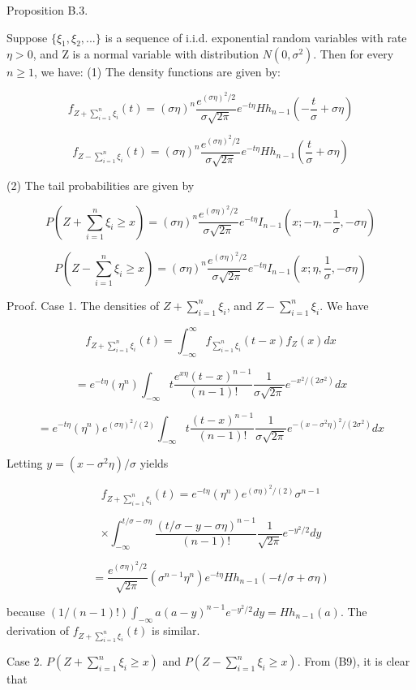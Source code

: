 Proposition B.3.

Suppose $\{\xi_{1},\xi_{2},...\}$ is a sequence of i.i.d. exponential random variables with rate $\eta>0$, and Z is a normal variable with distribution $N(0,\sigma^{2})$. Then for every $ n \geq 1$, we have: (1) The density functions are given by:

$$f_{Z+\sum_{i=1}^{n}\xi_{i}}(t)=(\sigma\eta)^{n}\frac{e^{(\sigma\eta)^{2}/2}}{\sigma\sqrt{2\pi}}e^{-t\eta}Hh_{n-1}(-\frac{t}{\sigma}+\sigma\eta)$$

$$f_{Z-\sum_{i=1}^{n}\xi_{i}}(t)=(\sigma\eta)^{n}\frac{e^{(\sigma\eta)^{2}/2}}{\sigma\sqrt{2\pi}}e^{-t\eta}Hh_{n-1}(\frac{t}{\sigma}+\sigma\eta)$$

(2) The tail probabilities are given by

$$P(Z+\sum_{i=1}^{n}\xi_{i}\geq x) = (\sigma\eta)^{n}\frac{e^{(\sigma\eta)^{2}/2}}{\sigma\sqrt{2\pi}}e^{-t\eta}I_{n-1}(x;-\eta,-\frac{1}{\sigma},-\sigma\eta)$$

$$P(Z-\sum_{i=1}^{n}\xi_{i}\geq x) = (\sigma\eta)^{n}\frac{e^{(\sigma\eta)^{2}/2}}{\sigma\sqrt{2\pi}}e^{-t\eta}I_{n-1}(x;\eta,\frac{1}{\sigma},-\sigma\eta)$$

Proof. Case 1. The densities of $Z+\sum_{i=1}^{n}\xi_{i}$, and $Z-\sum_{i=1}^{n}\xi_{i}$. We have

$$f_{Z+\sum_{i=1}^{n}\xi_{i}}(t)=\int_{-\infty}^{\infty}f_{\sum_{i=1}^{n}\xi_{i}}(t-x)f_{Z}(x)dx$$

$$=e^{-t\eta}(\eta^{n})\int_{-\infty}{t}\frac{e^{x\eta}(t-x)^{n-1}}{(n-1)!}\frac{1}{\sigma\sqrt{2\pi}}e^{-x^{2}/(2\sigma^{2})}dx$$

$$=e^{-t\eta}(\eta^{n})e^{(\sigma\eta)^{2}/(2)}\int_{-\infty}{t}\frac{(t-x)^{n-1}}{(n-1)!}\frac{1}{\sigma\sqrt{2\pi}}e^{-(x-\sigma^{2}\eta)^{2}/(2\sigma^{2})}dx$$

Letting $y=(x-\sigma^{2}\eta)/\sigma$ yields

$$f_{Z+\sum_{i=1}^{n}\xi_{i}}(t)=e^{-t\eta}(\eta^{n})e^{(\sigma\eta)^{2}/(2)}\sigma^{n-1}$$

$$\times\int_{-\infty}^{t/\sigma-\sigma\eta}\frac{(t/\sigma - y -\sigma\eta)^{n-1}}{(n-1)!}\frac{1}{\sqrt{2\pi}}e^{-y^{2}/2}dy$$

$$=\frac{e^{(\sigma\eta)^{2}/2}}{\sqrt{2\pi}}(\sigma^{n-1}\eta^{n})e^{-t\eta}Hh_{n-1}(-t/\sigma + \sigma\eta)$$

because $(1/(n-1)!)\int_{-\infty}{a}(a-y)^{n-1}e^{-y^{2}/2}dy=Hh_{n-1}(a)$. The derivation of $f_{Z+\sum_{i=1}^{n}\xi_{i}}(t)$ is similar.

Case 2. $P(Z+\sum_{i=1}^{n}\xi_{i}\geq x)$ and $P(Z-\sum_{i=1}^{n}\xi_{i}\geq x)$. From (B9), it is clear that

